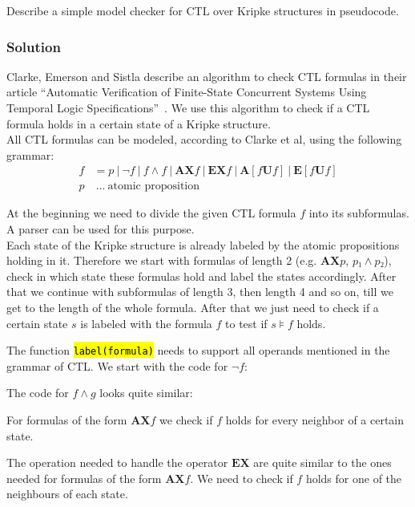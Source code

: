 \documentclass[a4paper, 12pt]{article}
\newcommand{\codeinput}[1]
{
    \begin{leftbar}
        {\fontsize{9pt}{11pt}}
    \end{leftbar}
}
\newcommand{\code}[1]
{
    \hl{\texttt{#1}}
}
\begin{document}
Describe a simple model checker for CTL over Kripke structures in pseudocode.

\subsubsection{Solution}

Clarke, Emerson and Sistla describe an algorithm to check CTL formulas in
their article “Automatic Verification of Finite-State Concurrent Systems Using
Temporal Logic Specifications”~\cite{Clarke1986AutomaticVerification}. We use
this algorithm to check if a CTL formula holds in a certain state of a Kripke
structure.\\

All CTL formulas can be modeled, according to Clarke et al, using the following
grammar:
\begin{align*}
    f & = p ~|~ ¬f ~|~ f ∧ f ~|~
          \mathbf{AX} f ~|~ \mathbf{EX} f ~|~
          \mathbf{A}[f \mathbf{U} f] ~|~ \mathbf{E}[f \mathbf{U} f]\\
    p & ~…~ \text{atomic proposition}
\end{align*}

At the beginning we need to divide the given CTL formula $f$ into its
subformulas. A parser can be used for this purpose.\\

Each state of the Kripke structure is already labeled by the atomic
propositions holding in it. Therefore we start with formulas of length 2 (e.g.
$\mathbf{AX} p$, $p₁ ∧ p₂$), check in which state these formulas hold and
label the states accordingly. After that we continue with subformulas of
length 3, then length 4 and so on, till we get to the length of the whole
formula. After that we just need to check if a certain state $s$ is labeled
with the formula $f$ to test if $s⊧f$ holds.

\codeinput{model_check}

The function \code{label(formula)} needs to support all operands mentioned in
the grammar of CTL. We start with the code for $¬f$:

\codeinput{label_not}

The code for $f ∧ g$ looks quite similar:

\codeinput{label_or}

For formulas of the form $\mathbf{AX} f$ we check if $f$ holds for every
neighbor of a certain state.

\codeinput{label_AX}

The operation needed to handle the operator $\mathbf{EX}$ are quite similar to
the ones needed for formulas of the form $\mathbf{AX} f$. We need to check if
$f$ holds for one of the neighbours of each state.
\end{document}
